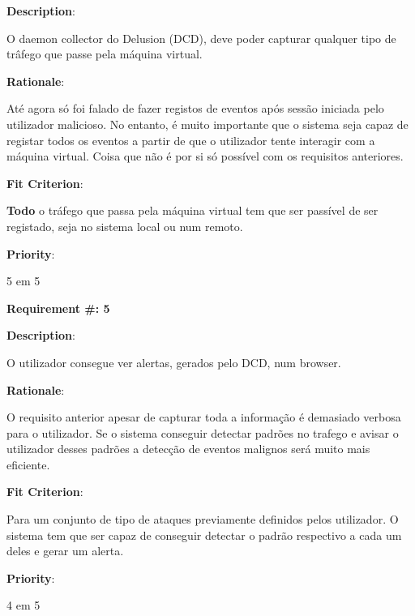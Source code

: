 \begin{description}
\item \textbf{Description}:

O daemon collector do Delusion (DCD), deve poder capturar qualquer tipo de trâfego que passe pela máquina virtual.

\item \textbf{Rationale}:

Até agora só foi falado de fazer registos de eventos após sessão iniciada pelo utilizador malicioso. No entanto, é muito importante
que o sistema seja capaz de registar todos os eventos a partir de que o utilizador tente interagir com a máquina virtual. Coisa que não é por si 
só possível com os requisitos anteriores.

\item \textbf{Fit Criterion}:

\textbf{Todo} o tráfego que passa pela máquina virtual tem que ser passível de ser registado, seja no sistema local ou num remoto.

\item \textbf{Priority}:

5 em 5

\end{description}

\pagebreak





\begin{minipage}{0.55\textwidth}
\begin{flushleft}\textbf{Requirement \#: 5}\end{flushleft}
\end{minipage}
\begin{minipage}{0.4\textwidth}
\end{minipage}

\begin{description}
\item \textbf{Description}:

O utilizador consegue ver alertas, gerados pelo DCD, num browser.

\item \textbf{Rationale}:

O requisito anterior apesar de capturar toda a informação é demasiado verbosa para o utilizador. Se o sistema conseguir detectar padrões no 
trafego e avisar o utilizador desses padrões a detecção de eventos malignos será muito mais eficiente.

\item \textbf{Fit Criterion}:

Para um conjunto de tipo de ataques previamente definidos pelos utilizador. O sistema tem que ser capaz de conseguir detectar o padrão respectivo
a cada um deles e gerar um alerta.

\item \textbf{Priority}:

4 em 5

\end{description}

